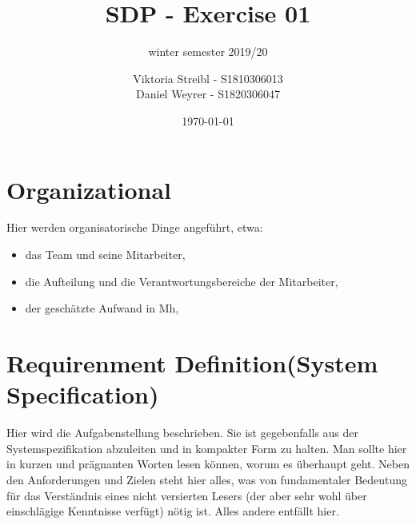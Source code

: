 


\title{SDP - Exercise 01} %
\subtitle{winter semester 2019/20} %
\author{
Viktoria Streibl - S1810306013\\
  Daniel Weyrer - S1820306047
} %
\date{\today} %

\maketitle %

\newpage
\tableofcontents %
\newpage


\section{Organizational}

Hier werden organisatorische Dinge angeführt, etwa:
\begin{itemize}
	\item das Team und seine Mitarbeiter,
	\item die Aufteilung und die Verantwortungsbereiche der Mitarbeiter,
	\item der geschätzte Aufwand in Mh,
\end{itemize}




\section{Requirenment Definition(System Specification)}

Hier wird die Aufgabenstellung beschrieben. Sie ist gegebenfalls aus der Systemspezifikation abzuleiten und in kompakter Form zu halten. Man sollte hier in kurzen und
prägnanten Worten lesen können, worum es überhaupt geht. Neben den Anforderungen und Zielen steht hier alles, was von fundamentaler Bedeutung für das Verständnis
eines nicht versierten Lesers (der aber sehr wohl über einschlägige Kenntnisse verfügt) nötig ist. Alles andere entfällt hier.

